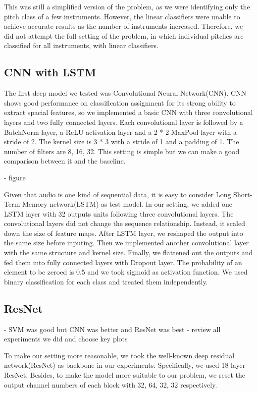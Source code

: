 \documentclass{article}
\begin{document}
This was still a simplified version of the problem, as we were identifying only the pitch class of a few instruments. However, the linear classifiers were unable to achieve accurate results as the number of instruments increased. Therefore, we did not attempt the full setting of the problem, in which individual pitches are classified for all instruments, with linear classifiers. 


\subsection{CNN with LSTM}

The first deep model we tested was Convolutional Neural Network(CNN). CNN shows good performance on classification assignment for its strong ability to extract spacial features, so we implemented a basic CNN with three convolutional layers and two fully connected layers. Each convolutional layer is followed by a BatchNorm layer, a ReLU activation layer and a 2 * 2  MaxPool layer with a stride of 2. The kernel size is 3 * 3 with a stride of 1 and a padding of 1. The number of filters are 8, 16, 32. This setting is simple but we can make a good comparison between it and the baseline. 

- figure

Given that audio is one kind of sequential data, it is easy to consider Long Short-Term Memory network(LSTM) as test model. In our setting, we added one LSTM layer with 32 outputs units following three convolutional layers. The convolutional layers did not change the sequence relationship. Instead, it scaled down the size of feature maps. After LSTM layer, we reshaped the output into the same size before inputing. Then we implemented another convolutional layer with the same structure and kernel size. Finally, we flattened out the outputs and fed them into fully connected layers with Dropout layer. The probability of an element to be zeroed is 0.5 and we took sigmoid as activation function. We used binary classification for each class and treated them independently.  


\subsection{ResNet}
- SVM was good but CNN was better and ResNet was best
- review all experiments we did and choose key plots

To make our setting more reasonable, we took the well-known deep residual network(ResNet) as backbone in our experiments. Specifically, we used 18-layer ResNet. Besides, to make the model more suitable to our problem, we reset the output channel numbers of each block with 32, 64, 32, 32 respectively. 
\end{document}
